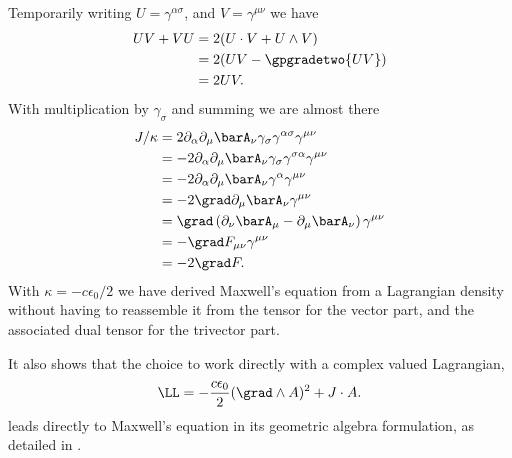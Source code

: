 Temporarily writing \(U = \gamma^{\alpha\sigma}\), and \(V = \gamma^{\mu\nu}\) we have
%
\begin{equation}\label{eqn:lagrangianFieldDensity:440}
\begin{aligned}
U V + V U
&= 2 (U \cdot V + U \wedge V) \\
&= 2 (U V - \gpgradetwo{U V} ) \\
&= 2 U V.
\end{aligned}
\end{equation}
%
With multiplication by \(\gamma_{\sigma}\) and summing we are almost there
%
\begin{equation}\label{eqn:lagrangianFieldDensity:460}
\begin{aligned}
J/\kappa
&= 2 \partial_{\alpha} \partial_{\mu} \barA_{\nu} \gamma_{\sigma} \gamma^{\alpha\sigma} \gamma^{\mu\nu} \\
&= -2 \partial_{\alpha} \partial_{\mu} \barA_{\nu} \gamma_{\sigma} \gamma^{\sigma\alpha} \gamma^{\mu\nu} \\
&= -2 \partial_{\alpha} \partial_{\mu} \barA_{\nu} \gamma^{\alpha} \gamma^{\mu\nu} \\
&= -2 \grad \partial_{\mu} \barA_{\nu} \gamma^{\mu\nu} \\
&= \grad \left( \partial_{\nu} \barA_{\mu} - \partial_{\mu} \barA_{\nu} \right) \gamma^{\mu\nu} \\
&= -\grad F_{\mu\nu} \gamma^{\mu\nu} \\
&= -2 \grad F.
\end{aligned}
\end{equation}
%
With \(\kappa = - c \epsilon_0/2\) we have derived Maxwell's equation  from a Lagrangian density without having to reassemble it from the tensor  for the vector part, and the associated dual tensor 
for the trivector part.

It also shows that the choice to work directly with a complex valued Lagrangian,
%
\begin{equation}
\LL = - \frac{c \epsilon_0}{2} (\grad \wedge A)^2 + J \cdot A.
\end{equation}
%
leads directly to Maxwell's equation in its geometric algebra formulation, as
detailed in \citep{doran2003gap}.
%
